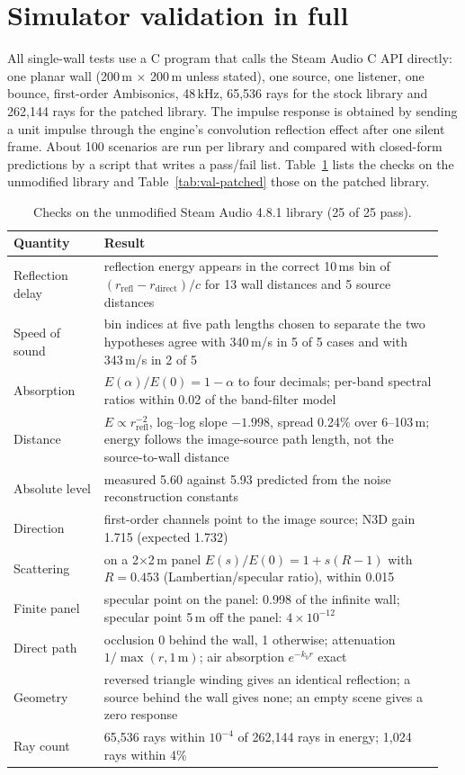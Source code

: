 \section{Simulator validation in full}
\label{app:validation}

All single-wall tests use a C program that calls the Steam Audio C API directly: one planar wall (200\,m $\times$ 200\,m unless stated), one source, one listener, one bounce, first-order Ambisonics, 48\,kHz, 65{,}536 rays for the stock library and 262{,}144 rays for the patched library. The impulse response is obtained by sending a unit impulse through the engine's convolution reflection effect after one silent frame. About 100 scenarios are run per library and compared with closed-form predictions by a script that writes a pass/fail list. Table~\ref{tab:val-stock} lists the checks on the unmodified library and Table~\ref{tab:val-patched} those on the patched library.

\begin{table}[h]
\caption{Checks on the unmodified Steam Audio 4.8.1 library (25 of 25 pass).}
\label{tab:val-stock}
\centering\small
\begin{tabular}{p{0.2\linewidth}p{0.75\linewidth}}
\toprule
Quantity & Result \\
\midrule
Reflection delay & reflection energy appears in the correct 10\,ms bin of $(r_\text{refl}-r_\text{direct})/c$ for 13 wall distances and 5 source distances \\
Speed of sound & bin indices at five path lengths chosen to separate the two hypotheses agree with 340\,m/s in 5 of 5 cases and with 343\,m/s in 2 of 5 \\
Absorption & $E(\alpha)/E(0)=1-\alpha$ to four decimals; per-band spectral ratios within 0.02 of the band-filter model \\
Distance & $E \propto r_\text{refl}^{-2}$, log--log slope $-1.998$, spread 0.24\% over 6--103\,m; energy follows the image-source path length, not the source-to-wall distance \\
Absolute level & measured 5.60 against 5.93 predicted from the noise reconstruction constants \\
Direction & first-order channels point to the image source; N3D gain 1.715 (expected 1.732) \\
Scattering & on a 2$\times$2\,m panel $E(s)/E(0)=1+s(R-1)$ with $R=0.453$ (Lambertian/specular ratio), within 0.015 \\
Finite panel & specular point on the panel: 0.998 of the infinite wall; specular point 5\,m off the panel: $4\times10^{-12}$ \\
Direct path & occlusion 0 behind the wall, 1 otherwise; attenuation $1/\max(r,1\,\text{m})$; air absorption $e^{-k_b r}$ exact \\
Geometry & reversed triangle winding gives an identical reflection; a source behind the wall gives none; an empty scene gives a zero response \\
Ray count & 65{,}536 rays within $10^{-4}$ of 262{,}144 rays in energy; 1{,}024 rays within 4\% \\
\bottomrule
\end{tabular}
\end{table}

